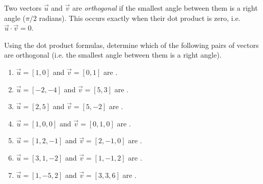 \documentclass{ximera}
\begin{document}
\begin{definition}
    Two vectors $\vec{u}$ and $\vec{v}$ are \textit{orthogonal} if the smallest angle between them is a right angle ($\pi/2$ radians). This occurs exactly when their dot product is zero, i.e. $\vec{u}\cdot\vec{v}=0$.
\end{definition}

\begin{problem}
    Using the dot product formulas, determine which of the following pairs of vectors are orthogonal (i.e. the smallest angle between them is a right angle).
    \begin{enumerate}
        \item $\vec{u}=[1,0]$ and $\vec{v}=[0,1]$ are .
        \item $\vec{u}=[-2,-4]$ and $\vec{v}=[5,3]$ are .
        \item $\vec{u}=[2,5]$ and $\vec{v}=[5,-2]$ are .
        \item $\vec{u}=[1,0,0]$ and $\vec{v}=[0,1,0]$ are .
        \item $\vec{u}=[1,2,-1]$ and $\vec{v}=[2,-1,0]$ are .
        \item $\vec{u}=[3,1,-2]$ and $\vec{v}=[1,-1,2]$ are .
        \item $\vec{u}=[1,-5,2]$ and $\vec{v}=[3,3,6]$ are .
    \end{enumerate}
\end{problem}
\end{document}

